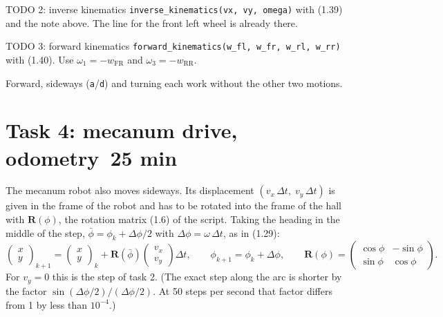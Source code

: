 \documentclass[11pt,a4paper,parskip=half]{scrartcl}
\newcommand{\thema}[1]{\texttt{#1}}
\newcommand{\minutes}[1]{\hfill{\normalsize\mdseries\color{ohmgrey}\faClock[regular]~#1 min}}
\begin{document}
\begin{todo}{TODO 2: inverse kinematics}
\thema{inverse\_kinematics(vx, vy, omega)} with (1.39) and the note above. The line for the front left
wheel is already there.
\end{todo}

\begin{todo}{TODO 3: forward kinematics}
\thema{forward\_kinematics(w\_fl, w\_fr, w\_rl, w\_rr)} with (1.40). Use \(\omega_1 = -w_\text{FR}\) and
\(\omega_3 = -w_\text{RR}\).
\end{todo}

\begin{checkpoint}
Forward, sideways (\thema{a}/\thema{d}) and turning each work without the other two motions.
\end{checkpoint}

\newpage
\section{Task 4: mecanum drive, odometry\minutes{25}}
\label{sec:task4}
The mecanum robot also moves sideways. Its displacement \((v_x\,\Delta t,\; v_y\,\Delta t)\) is given
in the frame of the robot and has to be rotated into the frame of the hall with \(\mathbf R(\phi)\),
the rotation matrix (1.6) of the script. Taking the heading in the middle of the step,
\(\bar\phi = \phi_k + \Delta\phi/2\) with \(\Delta\phi = \omega\,\Delta t\), as in (1.29):
\begin{equation}
  \begin{pmatrix} x \\ y \end{pmatrix}_{k+1} =
  \begin{pmatrix} x \\ y \end{pmatrix}_{k} +
  \mathbf R(\bar\phi) \begin{pmatrix} v_x \\ v_y \end{pmatrix} \Delta t ,
  \qquad
  \phi_{k+1} = \phi_k + \Delta\phi ,
  \qquad
  \mathbf R(\phi) = \begin{pmatrix}\cos\phi & -\sin\phi\\ \sin\phi & \cos\phi\end{pmatrix}.
  \label{eq:odom}
\end{equation}
For \(v_y = 0\) this is the step of task 2. (The exact step along the arc is shorter by the factor
\(\sin(\Delta\phi/2)/(\Delta\phi/2)\). At 50 steps per second that factor differs from 1 by less than
\(10^{-4}\).)
\end{document}
